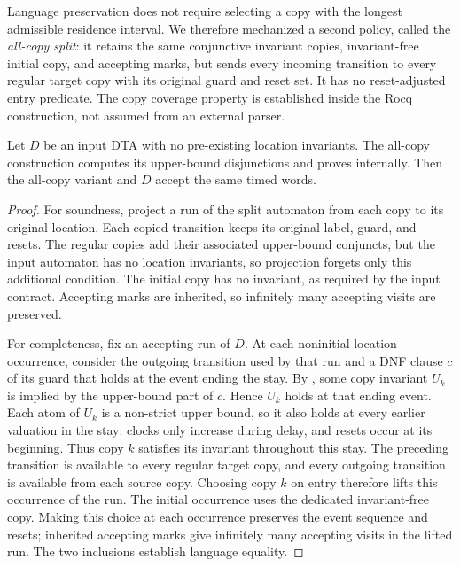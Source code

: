 Language preservation does not require selecting a copy with the longest
admissible residence interval. We therefore mechanized a second policy,
called the \emph{all-copy split}: it retains the same conjunctive invariant
copies, invariant-free initial copy, and accepting marks, but sends every
incoming transition to every regular target copy with its original guard and
reset set. It has no reset-adjusted entry predicate. The copy coverage
property  is established inside the Rocq
construction, not assumed from an external parser.

\begin{theorem}
Let $D$ be an input DTA with no pre-existing location invariants. The
all-copy construction computes its upper-bound disjunctions and proves
 internally. Then the all-copy variant and $D$
accept the same timed words.
\end{theorem}
\begin{proof}
For soundness, project a run of the split automaton from each copy to its
original location. Each copied transition keeps its original label, guard,
and resets. The regular copies add their associated upper-bound conjuncts,
but the input automaton has no location invariants, so projection forgets
only this additional condition. The initial copy has no invariant, as required
by the input contract. Accepting marks are inherited, so infinitely many
accepting visits are preserved.

For completeness, fix an accepting run of $D$. At each noninitial location
occurrence, consider the outgoing transition used by that run and a DNF
clause $c$ of its guard that holds at the event ending the stay. By
, some copy invariant $U_k$ is implied by the
upper-bound part of $c$. Hence $U_k$ holds at that ending event. Each atom
of $U_k$ is a non-strict upper bound, so it also holds at every earlier
valuation in the stay: clocks only increase during delay, and resets occur
at its beginning. Thus copy $k$ satisfies its invariant throughout this
stay. The preceding transition is available to every regular target copy,
and every outgoing transition is available from each source copy. Choosing
copy $k$ on entry therefore lifts this occurrence of the run. The initial
occurrence uses the dedicated invariant-free copy. Making this choice at
each occurrence preserves the event sequence and resets; inherited
accepting marks give infinitely many accepting visits in the lifted run.
The two inclusions establish language equality.
\end{proof}

